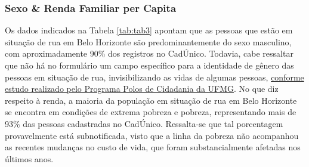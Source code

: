 \documentclass[12pt]{article}
\begin{document}
\subsubsection{Sexo \& Renda Familiar per Capita}

Os dados indicados na Tabela \ref{tab:tab3} apontam que as pessoas que estão em situação de rua em Belo Horizonte são predominantemente do sexo masculino, com aproximadamente 90\% dos registros no CadÚnico. Todavia, cabe ressaltar que não há no formulário um campo específico para a identidade de gênero das pessoas em situação de rua, invisibilizando as vidas de algumas pessoas, \href{http://pepsic.bvsalud.org/pdf/gerais/v8nspe/05.pdf}{conforme estudo realizado pelo Programa Polos de Cidadania da UFMG}. No que diz respeito à renda, a maioria da população em situação de rua em Belo Horizonte se encontra em condições de extrema pobreza e pobreza, representando mais de 93\% das pessoas cadastradas no CadÚnico. Ressalta-se que tal porcentagem provavelmente está subnotificada, visto que a linha da pobreza não acompanhou as recentes mudanças no custo de vida, que foram substancialmente afetadas nos últimos anos.\\
\end{document}
